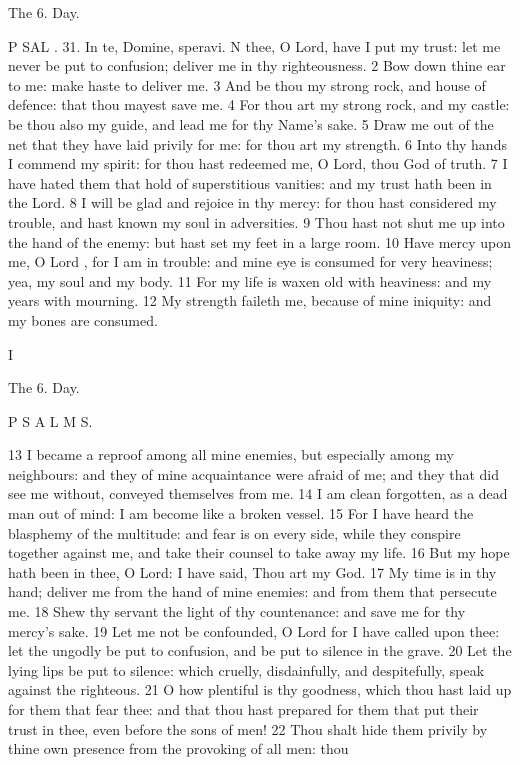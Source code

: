 The 6. Day.

P SAL . 31. In te, Domine, speravi. N thee, O Lord, have I put my trust: let me never be put to confusion; deliver me in thy righteousness. 2 Bow down thine ear to me: make haste to deliver me. 3 And be thou my strong rock, and house of defence: that thou mayest save me. 4 For thou art my strong rock, and my castle: be thou also my guide, and lead me for thy Name’s sake. 5 Draw me out of the net that they have laid privily for me: for thou art my strength. 6 Into thy hands I commend my spirit: for thou hast redeemed me, O Lord, thou God of truth. 7 I have hated them that hold of superstitious vanities: and my trust hath been in the Lord. 8 I will be glad and rejoice in thy mercy: for thou hast considered my trouble, and hast known my soul in adversities. 9 Thou hast not shut me up into the hand of the enemy: but hast set my feet in a large room. 10 Have mercy upon me, O Lord , for I am in trouble: and mine eye is consumed for very heaviness; yea, my soul and my body. 11 For my life is waxen old with heaviness: and my years with mourning. 12 My strength faileth me, because of mine iniquity: and my bones are consumed.

I

The 6. Day.

P S A L M S.

13 I became a reproof among all mine enemies, but especially among my neighbours: and they of mine acquaintance were afraid of me; and they that did see me without, conveyed themselves from me. 14 I am clean forgotten, as a dead man out of mind: I am become like a broken vessel. 15 For I have heard the blasphemy of the multitude: and fear is on every side, while they conspire together against me, and take their counsel to take away my life. 16 But my hope hath been in thee, O Lord: I have said, Thou art my God. 17 My time is in thy hand; deliver me from the hand of mine enemies: and from them that persecute me. 18 Shew thy servant the light of thy countenance: and save me for thy mercy’s sake. 19 Let me not be confounded, O Lord for I have called upon thee: let the ungodly be put to confusion, and be put to silence in the grave. 20 Let the lying lips be put to silence: which cruelly, disdainfully, and despitefully, speak against the righteous. 21 O how plentiful is thy goodness, which thou hast laid up for them that fear thee: and that thou hast prepared for them that put their trust in thee, even before the sons of men! 22 Thou shalt hide them privily by thine own presence from the provoking of all men: thou

